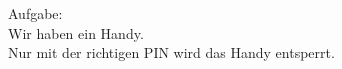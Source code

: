 \documentclass[preview]{standalone}
\begin{document}
\begin{center}
Aufgabe: \\ Wir haben ein Handy. \\ Nur mit der richtigen PIN wird das Handy entsperrt.
\end{center}
\end{document}
